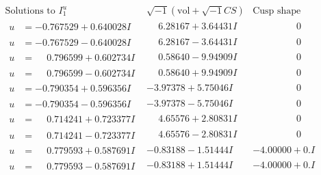 \documentclass[1p]{elsarticle_modified}
\theoremstyle{definition}
\newcommand{\I}{\sqrt{-1}}
\begin{document}
$$\begin{array}{c|c|c}  
\text{Solutions to }I^u_{1}& \I (\text{vol} + \sqrt{-1}CS) & \text{Cusp shape}\\
 \hline 
\begin{aligned}
u &= -0.767529 + 0.640028 I\end{aligned}
 & \phantom{-}6.28167 + 3.64431 I & \phantom{-0.000000 } 0 \\ \hline\begin{aligned}
u &= -0.767529 - 0.640028 I\end{aligned}
 & \phantom{-}6.28167 - 3.64431 I & \phantom{-0.000000 } 0 \\ \hline\begin{aligned}
u &= \phantom{-}0.796599 + 0.602734 I\end{aligned}
 & \phantom{-}0.58640 - 9.94909 I & \phantom{-0.000000 } 0 \\ \hline\begin{aligned}
u &= \phantom{-}0.796599 - 0.602734 I\end{aligned}
 & \phantom{-}0.58640 + 9.94909 I & \phantom{-0.000000 } 0 \\ \hline\begin{aligned}
u &= -0.790354 + 0.596356 I\end{aligned}
 & -3.97378 + 5.75046 I & \phantom{-0.000000 } 0 \\ \hline\begin{aligned}
u &= -0.790354 - 0.596356 I\end{aligned}
 & -3.97378 - 5.75046 I & \phantom{-0.000000 } 0 \\ \hline\begin{aligned}
u &= \phantom{-}0.714241 + 0.723377 I\end{aligned}
 & \phantom{-}4.65576 + 2.80831 I & \phantom{-0.000000 } 0 \\ \hline\begin{aligned}
u &= \phantom{-}0.714241 - 0.723377 I\end{aligned}
 & \phantom{-}4.65576 - 2.80831 I & \phantom{-0.000000 } 0 \\ \hline\begin{aligned}
u &= \phantom{-}0.779593 + 0.587691 I\end{aligned}
 & -0.83188 - 1.51444 I & -4.00000 + 0. I\phantom{ +0.000000I} \\ \hline\begin{aligned}
u &= \phantom{-}0.779593 - 0.587691 I\end{aligned}
 & -0.83188 + 1.51444 I & -4.00000 + 0. I\phantom{ +0.000000I} \\ \hline\begin{aligned}

\end{aligned}
\end{array}$$
\end{document}
